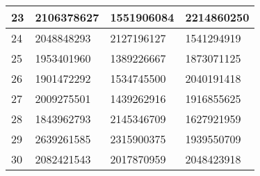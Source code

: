 \begin{table}[ht!]
\begin{tabularx}{\textwidth}{l|X|X|X}
		23&	2106378627	&	1551906084	&	2214860250	\\ \hline
		24&	2048848293	&	2127196127	&	1541294919	\\ \hline
		25&	1953401960	&	1389226667	&	1873071125	\\ \hline
		26&	1901472292	&	1534745500	&	2040191418	\\ \hline
		27&	2009275501	&	1439262916	&	1916855625	\\ \hline
		28&	1843962793	&	2145346709	&	1627921959	\\ \hline
		29&	2639261585	&	2315900375	&	1939550709	\\ \hline
		30&	2082421543	&	2017870959	&	2048423918	\\ \hline
		
		\end{tabularx}
	\end{table}
	
